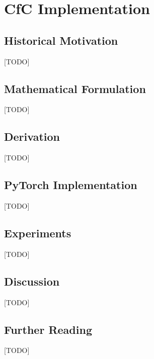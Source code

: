 
\chapter{CfC Implementation}
\label{ch:11_cfc_implementation}


\section{Historical Motivation}
[TODO]

\section{Mathematical Formulation}
[TODO]

\section{Derivation}
[TODO]

\section{PyTorch Implementation}
[TODO]

\section{Experiments}
[TODO]

\section{Discussion}
[TODO]

\section{Further Reading}
[TODO]
